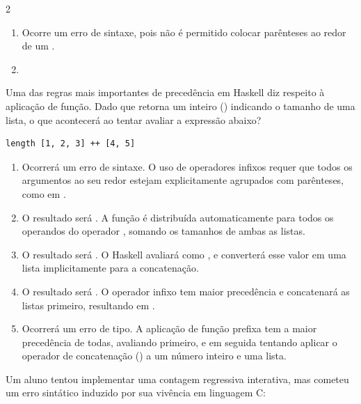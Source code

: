\documentclass[a4paper,10pt,brazil]{article}
\begin{document}
\begin{multicols}{2}
\begin{enumerate}
  \item Ocorre um erro de sintaxe, pois não é permitido colocar parênteses ao redor de um .

  \item {}


\end{enumerate}

Uma das regras mais importantes de precedência em Haskell diz respeito à aplicação de função. Dado que  retorna um inteiro () indicando o tamanho de uma lista, o que acontecerá ao tentar avaliar a expressão abaixo?
\begin{verbatim}
length [1, 2, 3] ++ [4, 5]
\end{verbatim}

\begin{enumerate}
  \item Ocorrerá um erro de sintaxe. O uso de operadores infixos requer que todos os argumentos ao seu redor estejam explicitamente agrupados com parênteses, como em .

  \item O resultado será . A função  é distribuída automaticamente para todos os operandos do operador \haskellinline{++}, somando os tamanhos de ambas as listas.

  \item O resultado será \haskellinline{[3, 4, 5]}. O Haskell avaliará  como , e converterá esse valor em uma lista implicitamente para a concatenação.

  \item O resultado será . O operador infixo \haskellinline{++} tem maior precedência e concatenará as listas primeiro, resultando em .

  \item Ocorrerá um erro de tipo. A aplicação de função prefixa tem a maior precedência de todas, avaliando  primeiro, e em seguida tentando aplicar o operador de concatenação (\haskellinline{++}) a um número inteiro e uma lista.


\end{enumerate}

Um aluno tentou implementar uma contagem regressiva interativa, mas cometeu um erro sintático induzido por sua vivência em linguagem C:


\end{multicols}
\end{document}
